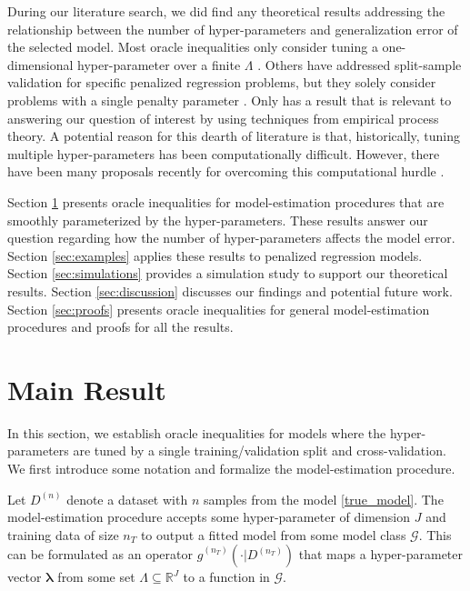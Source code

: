 \documentclass[12pt]{article}
\begin{document}
During our literature search, we did find any theoretical results addressing the relationship between the number of hyper-parameters and generalization error of the selected model. Most oracle inequalities only consider tuning a one-dimensional hyper-parameter over a finite $\Lambda$ \citep{van2003unified, van2004asymptotic, gyorfi2006distribution}. Others have addressed split-sample validation for specific penalized regression problems, but they solely consider problems with a single penalty parameter \citep{golub1979generalized, chetverikov2016cross, chatterjee2015prediction}. Only \citet{lecue2012oracle} has a result that is relevant to answering our question of interest by using techniques from empirical process theory. A potential reason for this dearth of literature is that, historically, tuning multiple hyper-parameters has been computationally difficult. However, there have been many proposals recently for overcoming this computational hurdle \citep{bengio2000gradient, foo2008efficient, snoek2012practical}.

Section \ref{sec:main_results} presents oracle inequalities for model-estimation procedures that are smoothly parameterized by the hyper-parameters. These results answer our question regarding how the number of hyper-parameters affects the model error.
Section \ref{sec:examples} applies these results to penalized regression models.
Section \ref{sec:simulations} provides a simulation study to support our theoretical results.
Section \ref{sec:discussion} discusses our findings and potential future work.
Section \ref{sec:proofs} presents oracle inequalities for general model-estimation procedures and proofs for all the results.


\section{Main Result} \label{sec:main_results}

In this section, we establish oracle inequalities for models where the hyper-parameters are tuned by a single training/validation split and cross-validation. We first introduce some notation and formalize the model-estimation procedure. 

Let $D^{(n)}$ denote a dataset with $n$ samples from the model \eqref{true_model}. The model-estimation procedure accepts some hyper-parameter of dimension $J$ and training data of size $n_T$ to output a fitted model from some model class $\mathcal{G}$. This can be formulated as an operator $\hat{g}^{(n_T)}(\cdot | D^{(n_T)})$ that maps a hyper-parameter vector $\boldsymbol{\lambda}$ from some set $\Lambda \subseteq \mathbb{R}^J$ to a function in $\mathcal{G}$. 
\end{document}
